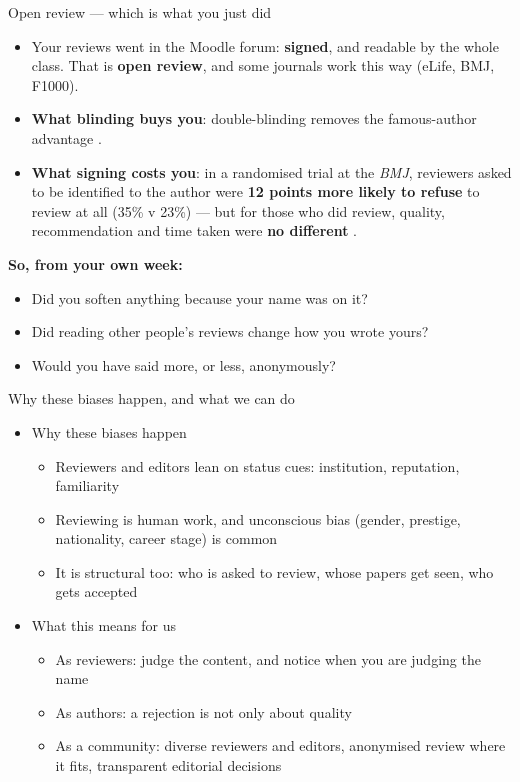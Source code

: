 \documentclass[aspectratio=169]{beamer}
\begin{document}
\begin{frame}{Open review --- which is what you just did}
\begin{itemize}
  \item Your reviews went in the Moodle forum: \textbf{signed}, and readable by
    the whole class.  That is \textbf{open review}, and some journals work this
    way (eLife, BMJ, F1000).
  \item \textbf{What blinding buys you}: double-blinding removes the famous-author
    advantage \citep{tomkins2017dblblind}.
  \item \textbf{What signing costs you}: in a randomised trial at the
    \emph{BMJ}, reviewers asked to be identified to the author were
    \textbf{12 points more likely to refuse} to review at all (35\% v 23\%) ---
    but for those who did review, quality, recommendation and time taken were
    \textbf{no different} \citep{vanrooyen1999open}.
\end{itemize}
\vspace{1ex}
\textbf{So, from your own week:}
\begin{itemize}
  \item Did you soften anything because your name was on it?
  \item Did reading other people's reviews change how you wrote yours?
  \item Would you have said more, or less, anonymously?
\end{itemize}
\end{frame}

\begin{frame}{Why these biases happen, and what we can do}
  \begin{itemize}
  \item Why these biases happen
    \begin{itemize}
    \item Reviewers and editors lean on status cues: institution, reputation, familiarity
    \item Reviewing is human work, and unconscious bias (gender, prestige, nationality, career stage) is common
    \item It is structural too: who is asked to review, whose papers get seen, who gets accepted
    \end{itemize}
  \item What this means for us
    \begin{itemize}
    \item As reviewers: judge the content, and notice when you are judging the name
    \item As authors: a rejection is not only about quality
    \item As a community: diverse reviewers and editors, anonymised review where it fits, transparent editorial decisions
    \end{itemize}
  \end{itemize}
\end{frame}
\end{document}
